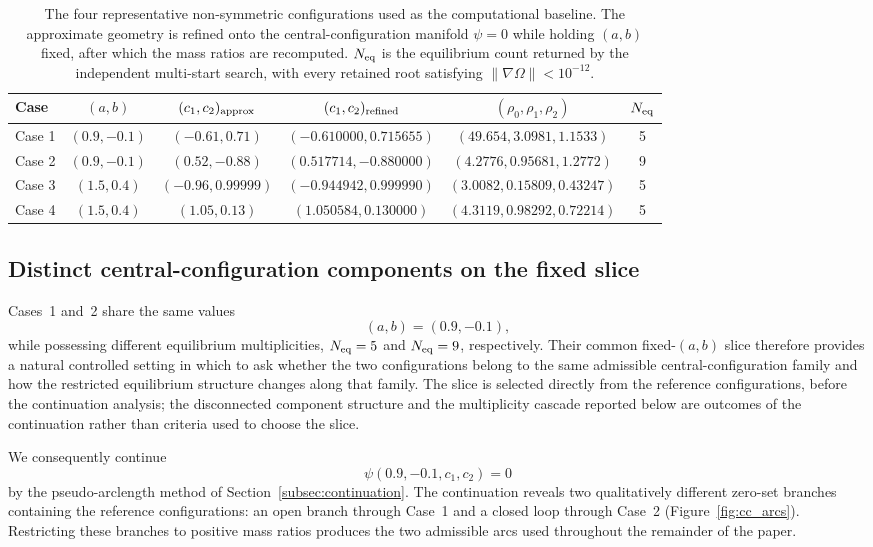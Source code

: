 \begin{table}[t]
\centering
\small
\caption{The four representative non-symmetric configurations used as the
computational baseline. The approximate geometry is refined onto the
central-configuration manifold $\psi=0$ while holding $(a,b)$ fixed, after
which the mass ratios are recomputed. $N_{\rm eq}$ is the equilibrium count
returned by the independent multi-start search, with every retained root
satisfying $\|\nabla\Omega\|<10^{-12}$.}
\label{tab:baseline}
\begin{tabular}{lccccc}
\hline
Case &
$(a,b)$ &
$(c_1,c_2)_{\rm approx}$ &
$(c_1,c_2)_{\rm refined}$ &
$(\rho_0,\rho_1,\rho_2)$ &
$N_{\rm eq}$\\
\hline
Case 1 &
$(0.9,-0.1)$ &
$(-0.61,0.71)$ &
$(-0.610000,0.715655)$ &
$(49.654,3.0981,1.1533)$ &
5\\

Case 2 &
$(0.9,-0.1)$ &
$(0.52,-0.88)$ &
$(0.517714,-0.880000)$ &
$(4.2776,0.95681,1.2772)$ &
9\\

Case 3 &
$(1.5,0.4)$ &
$(-0.96,0.99999)$ &
$(-0.944942,0.999990)$ &
$(3.0082,0.15809,0.43247)$ &
5\\

Case 4 &
$(1.5,0.4)$ &
$(1.05,0.13)$ &
$(1.050584,0.130000)$ &
$(4.3119,0.98292,0.72214)$ &
5\\
\hline
\end{tabular}
\end{table}


\subsection{Distinct central-configuration components on the fixed slice}
\label{subsec:components}

Cases~1 and~2 share the same values
\[
(a,b)=(0.9,-0.1),
\]
while possessing different equilibrium multiplicities,
$N_{\rm eq}=5$ and $N_{\rm eq}=9$, respectively. Their common
fixed-$(a,b)$ slice therefore provides a natural controlled setting in
which to ask whether the two configurations belong to the same admissible
central-configuration family and how the restricted equilibrium structure
changes along that family. The slice is selected directly from the
reference configurations, before the continuation analysis; the
disconnected component structure and the multiplicity cascade reported
below are outcomes of the continuation rather than criteria used to choose
the slice.

We consequently continue
\begin{equation}
\psi(0.9,-0.1,c_1,c_2)=0
\label{eq:fixed_slice_constraint}
\end{equation}
by the pseudo-arclength method of Section~\ref{subsec:continuation}. The continuation reveals two
qualitatively different zero-set branches containing the reference
configurations: an open branch through Case~1 and a closed loop through
Case~2 (Figure~\ref{fig:cc_arcs}). Restricting these branches to positive
mass ratios produces the two admissible arcs used throughout the remainder
of the paper.

